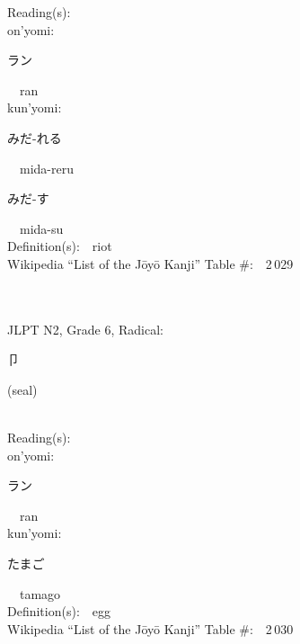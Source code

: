\begin{multicols}{2}
Reading(s):\ \ \\
{\hspace*{1em}}on'yomi:\ \ \\
{\hspace*{2em}}{\begin{CJK}{UTF8}{min} ラン \end{CJK}}\ \ ran\ \ \\
{\hspace*{1em}}kun'yomi:\ \ \\
{\hspace*{2em}}{\begin{CJK}{UTF8}{min} みだ-れる \end{CJK}}\ \ mida-reru\ \ \\
{\hspace*{2em}}{\begin{CJK}{UTF8}{min} みだ-す \end{CJK}}\ \ mida-su\ \ \\
Definition(s):\ \ riot \\
Wikipedia ``List of the J\=oy\=o Kanji'' Table \#:\ \ 2\,029 \\
\ \ \\
{\fontsize{34pt}{40pt}  }\ \ \\  %
{JLPT N2, Grade 6, Radical:\ \ {\begin{CJK}{UTF8}{min} 卩 \end{CJK}} (seal) } \\
Reading(s):\ \ \\
{\hspace*{1em}}on'yomi:\ \ \\
{\hspace*{2em}}{\begin{CJK}{UTF8}{min} ラン \end{CJK}}\ \ ran\ \ \\
{\hspace*{1em}}kun'yomi:\ \ \\
{\hspace*{2em}}{\begin{CJK}{UTF8}{min} たまご \end{CJK}}\ \ tamago\ \ \\
Definition(s):\ \ egg \\
Wikipedia ``List of the J\=oy\=o Kanji'' Table \#:\ \ 2\,030 \\
\ \ \\

\end{multicols}
